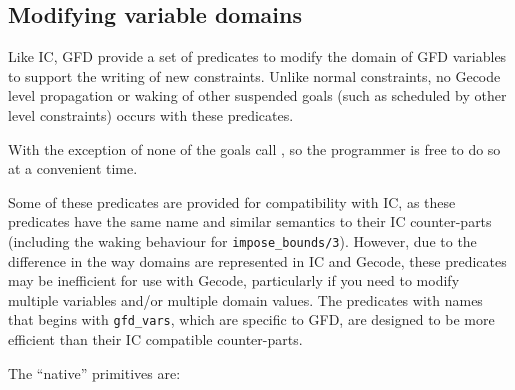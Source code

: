 \subsection{Modifying variable domains}

Like IC, GFD provide a set of predicates to modify the domain of GFD 
variables to support the writing of new constraints. Unlike normal constraints,
no Gecode level propagation or waking of other suspended goals (such as 
scheduled by other \eclipse level constraints) occurs with these predicates.

With the exception of
 none of
the goals call , so
the programmer is free to do so at a convenient time.

Some of these predicates are provided for compatibility with IC, as these 
predicates have the same name and similar semantics to their IC counter-parts
(including the waking behaviour for {\tt impose_bounds/3}).
However, due to the difference in the way domains are represented in IC and
Gecode, these predicates may be inefficient for use with Gecode, particularly
if you need to modify multiple variables and/or multiple domain values. 
The predicates with names that begins with {\tt gfd_vars}, which are specific
to GFD, are designed to be more efficient than their IC compatible 
counter-parts.

The ``native'' primitives are:

